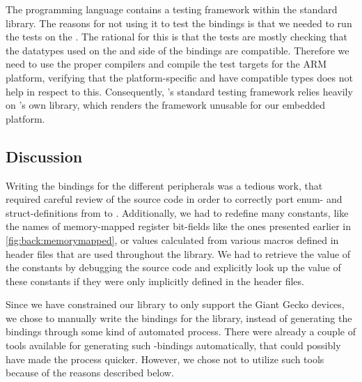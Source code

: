 The {\rust} programming language contains a testing framework within the standard library.
The reasons for not using it to test the bindings is that we needed to run the tests on the {\gecko}.
The rational for this is that the tests are mostly checking that the datatypes used on the {\rust} and {\C} side of the bindings are compatible.
Therefore we need to use the proper compilers and compile the test targets for the ARM platform, verifying that the platform-specific  and {\rustc} have compatible types does not help in respect to this.
Consequently, {\rust}'s standard testing framework relies heavily on {\rust}'s own {\std} library, which renders the framework unusable for our embedded platform.



\subsection{Discussion}

Writing the bindings for the different peripherals was a tedious work, that required careful review of the {\emlib} source code in order to correctly port enum- and struct-definitions from {\C} to {\rust}.
Additionally, we had to redefine many constants, like the names of memory-mapped register bit-fields like the ones presented earlier in \autoref{fig:back:memorymapped}, or values calculated from various {\C} macros defined in header files that are used throughout the library.
We had to retrieve the value of the constants by debugging the source code and explicitly look up the value of these constants if they were only implicitly defined in the header files.

Since we have constrained our library to only support the Giant Gecko devices, we chose to manually write the bindings for the library, instead of generating the bindings through some kind of automated process.
There were already a couple of tools available for generating such {\C}-bindings automatically, that could possibly have made the process quicker.
However, we chose not to utilize such tools because of the reasons described below.


